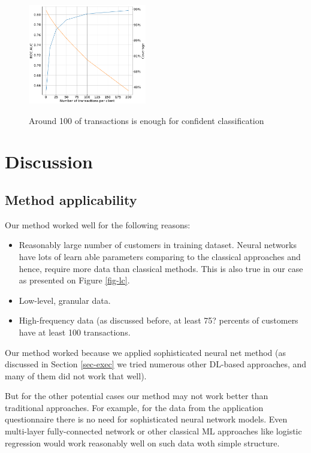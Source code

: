 \documentclass[sigconf]{acmart}
\begin{document}
\begin{figure}[ht]
  \caption{Around 100 of transactions is enough for confident classification}
  \includegraphics[width=0.46\textwidth]{information-vs-accuracy.png}
  \label{fig-tc}
\end{figure}

\section{Discussion}

\subsection{Method applicability}

Our method worked well for the following reasons:
\begin{itemize}
    \item Reasonably large number of customers in training dataset. Neural networks have lots of learn able parameters comparing to the classical approaches and hence, require more data than classical methods. This is also true in our case as presented on Figure \ref{fig-lc}.
    \item Low-level, granular data.
    \item High-frequency data (as discussed before, at least 75? percents of customers have at least 100 transactions.
\end{itemize}

Our method worked because we applied sophisticated neural net method (as discussed in Section \ref{sec-exec} we tried numerous other DL-based approaches, and many of them did not work that well).

But for the other potential cases our method may not work better than traditional approaches. For example, for the data from the application questionnaire there is no need for sophisticated neural network models. Even multi-layer fully-connected network or other classical ML approaches like logistic regression would work reasonably well on such data woth simple structure.
\end{document}
